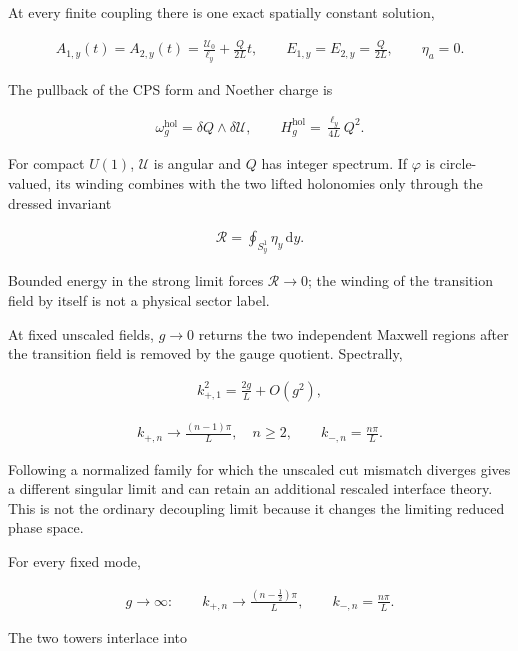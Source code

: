 At every finite coupling there is one exact spatially constant solution,

\begin{align}
A_{1,y}(t)=A_{2,y}(t)
=\frac{\mathcal U_0}{\ell_y}+\frac{Q}{2L}t,
\qquad
E_{1,y}=E_{2,y}=\frac{Q}{2L},
\qquad
\eta_a=0.
\end{align}

The pullback of the CPS form and Noether charge is

\begin{align}
\omega_g^{\mathrm{hol}}=\delta Q\wedge\delta\mathcal U,
\qquad
H_g^{\mathrm{hol}}=\frac{\ell_y}{4L}Q^2.
\end{align}

For compact $U(1)$, $\mathcal U$ is angular and $Q$ has integer spectrum. If $\varphi$ is circle-valued, its winding combines with the two lifted holonomies only through the dressed invariant

\begin{align}
\mathcal R=\oint_{S_y^1}\eta_y\,\mathrm dy.
\end{align}

Bounded energy in the strong limit forces $\mathcal R\to0$; the winding of the transition field by itself is not a physical sector label.

At fixed unscaled fields, $g\to0$ returns the two independent Maxwell regions after the transition field is removed by the gauge quotient. Spectrally,

\begin{align}
k_{+,1}^2=\frac{2g}{L}+O(g^2),
\end{align}

\begin{align}
k_{+,n}\longrightarrow\frac{(n-1)\pi}{L},
\quad n\geq2,
\qquad
k_{-,n}=\frac{n\pi}{L}.
\end{align}

Following a normalized family for which the unscaled cut mismatch diverges gives a different singular limit and can retain an additional rescaled interface theory. This is not the ordinary decoupling limit because it changes the limiting reduced phase space.

For every fixed mode,

\begin{align}
g\to\infty:
\qquad
k_{+,n}\longrightarrow\frac{(n-\frac12)\pi}{L},
\qquad
k_{-,n}=\frac{n\pi}{L}.
\end{align}

The two towers interlace into


